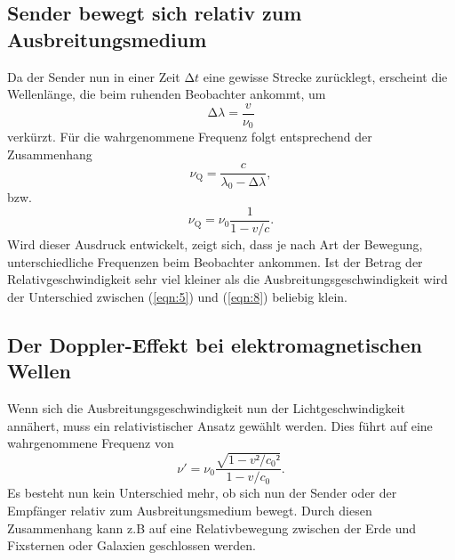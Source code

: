 \subsection{Sender bewegt sich relativ zum Ausbreitungsmedium}
Da der Sender nun in einer Zeit $\increment t$ eine gewisse Strecke zurücklegt, erscheint die Wellenlänge, die beim ruhenden Beobachter ankommt, um
\begin{equation}
  \increment \lambda = \frac{v}{\nu_0} \label{eqn:6}
\end{equation}
verkürzt.
Für die wahrgenommene Frequenz folgt entsprechend der Zusammenhang
\begin{equation}
  \nu_{\text{Q}} = \frac{c}{\lambda_0-\increment \lambda}, \label{eqn:7}
\end{equation}
bzw.
\begin{equation}
  \nu_{\text{Q}} = \nu_0 \frac{1}{1-v/c}. \label{eqn:8}
\end{equation}
Wird dieser Ausdruck entwickelt, zeigt sich, dass je nach Art der Bewegung, unterschiedliche Frequenzen beim Beobachter ankommen.
Ist der Betrag der Relativgeschwindigkeit sehr viel kleiner als die Ausbreitungsgeschwindigkeit wird der Unterschied zwischen (\ref{eqn:5}) und (\ref{eqn:8}) beliebig klein.
\subsection{Der Doppler-Effekt bei elektromagnetischen Wellen}
Wenn sich die Ausbreitungsgeschwindigkeit nun der Lichtgeschwindigkeit annähert, muss ein relativistischer Ansatz gewählt werden.
Dies führt auf eine wahrgenommene Frequenz von
\begin{equation}
  \nu' = \nu_0 \frac{\sqrt{1-v²/c_0²}}{1-v/c_0}. \label{eqn:9}
\end{equation}
Es besteht nun kein Unterschied mehr, ob sich nun der Sender oder der Empfänger relativ zum Ausbreitungsmedium bewegt.
Durch diesen Zusammenhang kann z.B auf eine Relativbewegung zwischen der Erde und Fixsternen oder Galaxien geschlossen werden.
